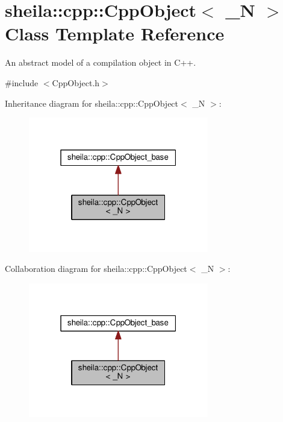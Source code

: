 \hypertarget{classsheila_1_1cpp_1_1CppObject}{}\section{sheila\+:\+:cpp\+:\+:Cpp\+Object$<$ \+\_\+N $>$ Class Template Reference}
\label{classsheila_1_1cpp_1_1CppObject}


An abstract model of a compilation object in C++.  




{\ttfamily \#include $<$Cpp\+Object.\+h$>$}



Inheritance diagram for sheila\+:\+:cpp\+:\+:Cpp\+Object$<$ \+\_\+N $>$\+:\nopagebreak
\begin{figure}[H]
\begin{center}
\leavevmode
\includegraphics[width=223pt]{classsheila_1_1cpp_1_1CppObject__inherit__graph}
\end{center}
\end{figure}


Collaboration diagram for sheila\+:\+:cpp\+:\+:Cpp\+Object$<$ \+\_\+N $>$\+:\nopagebreak
\begin{figure}[H]
\begin{center}
\leavevmode
\includegraphics[width=223pt]{classsheila_1_1cpp_1_1CppObject__coll__graph}
\end{center}
\end{figure}
